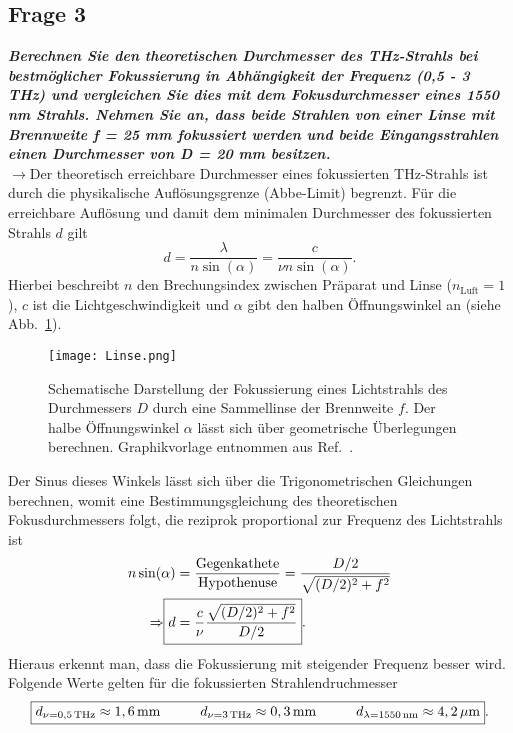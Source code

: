 \subsection{\label{subsec:FZV3}Frage 3}
\textbf{\textit{Berechnen Sie den theoretischen Durchmesser des THz-Strahls bei bestmöglicher
Fokussierung in Abhängigkeit der Frequenz (0,5 - 3 THz) und vergleichen Sie dies
mit dem Fokusdurchmesser eines 1550 nm Strahls. Nehmen Sie an, dass beide
Strahlen von einer Linse mit Brennweite f = 25 mm fokussiert werden und beide
Eingangsstrahlen einen Durchmesser von D = 20 mm besitzen.}}\\
$\rightarrow$Der theoretisch erreichbare Durchmesser eines fokussierten THz-Strahls ist durch 
die physikalische Auflösungsgrenze (Abbe-Limit) begrenzt. Für die erreichbare 
Auflösung und damit dem minimalen Durchmesser des fokussierten Strahls $d$ gilt
\begin{equation}
    d = \frac{\lambda}{n\sin(\alpha)} = \frac{c}{\nu n\sin(\alpha)}.
\end{equation} 
Hierbei beschreibt $n$ den Brechungsindex zwischen Präparat und Linse ($n_{\text{Luft}}=1$), $c$ ist die Lichtgeschwindigkeit und 
$\alpha$ gibt den halben Öffnungswinkel an (siehe Abb.~\ref{fig:abbe}). 
\begin{figure}[h!]
    \centering
    \texttt{[image: Linse.png]}
    \caption{\label{fig:abbe}Schematische Darstellung der Fokussierung eines Lichtstrahls des Durchmessers $D$
    durch eine Sammellinse der Brennweite $f$. Der halbe Öffnungswinkel $\alpha$ lässt sich 
    über geometrische Überlegungen berechnen. Graphikvorlage entnommen aus Ref.~\cite{Bild1}.}
\end{figure}\FloatBarrier
Der Sinus dieses Winkels lässt sich über die Trigonometrischen Gleichungen berechnen, womit 
eine Bestimmungsgleichung des theoretischen Fokusdurchmessers folgt, die reziprok proportional zur 
Frequenz des Lichtstrahls ist
\begin{align}
    n\sin(\alpha) &= \frac{\text{Gegenkathete}}{\text{Hypothenuse}} = \frac{D/2}{\sqrt{(D/2)^{2} + f^{2}}} \\
    \Rightarrow\Aboxed{d &= \frac{c}{\nu}\frac{\sqrt{(D/2)^{2} + f^{2}}}{D/2}}.
\end{align}
Hieraus erkennt man, dass die Fokussierung mit steigender Frequenz besser wird.
Folgende Werte gelten für die fokussierten Strahlendruchmesser
\begin{equation}
    \fbox{$d_{\nu=0,5\,\si{THz}} \approx 1,6\,\si{mm}\hspace{1cm}d_{\nu=3\,\si{THz}} \approx 0,3\,\si{mm}
    \hspace{1cm}d_{\lambda=1550\,\si{nm}} \approx 4,2\,\si{\mu m}$}.
\end{equation} \newpage
